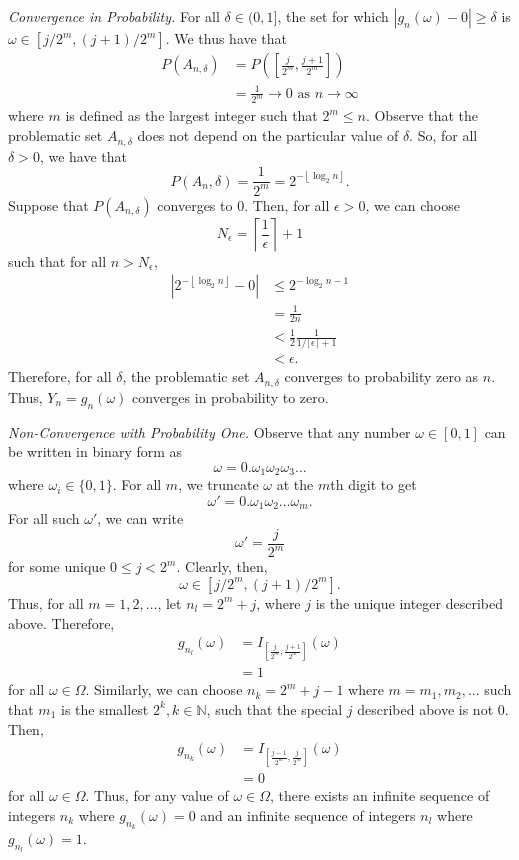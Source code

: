\documentclass[titlepage]{article}
\begin{document}
\textit{Convergence in Probability.} For all $\delta \in (0, 1]$, the set for which $|g_{n}(\omega) - 0| \geq \delta$ is $\omega \in [j/2^{m}, (j+1)/2^{m}]$. We thus have that 
\begin{align*}
    P(A_{n, \delta}) &= P\left(\left[\frac{j}{2^m}, \frac{j+1}{2^m}\right]\right) \\ 
                     &= \frac{1}{2^m} \rightarrow 0 \text{ as } n \rightarrow \infty
\end{align*}
where $m$ is defined as the largest integer such that $2^m \leq n$. Observe that the problematic set $A_{n,\delta}$ does not depend on the particular value of $\delta$. So, for all $\delta > 0$, we have that 
$$P(A_{n},\delta) = \frac{1}{2^{m}} = 2^{-\left\lfloor \log_{2}n \right\rfloor}.$$
Suppose that $P(A_{n,\delta})$ converges to $0$. Then, for all $\epsilon > 0$, we can choose 
$$N_{\epsilon} = \left\lceil \frac{1}{\epsilon} \right\rceil + 1$$
such that for all $n > N_{\epsilon}$, 
\begin{align*}
    |2^{-\left\lfloor \log_{2}n \right\rfloor} - 0| &\leq 2^{-\log_{2}n - 1} \\
                                                    &= \frac{1}{2n} \\
                                                    &< \frac{1}{2}\frac{1}{1/\lceil\epsilon\rceil+1} \\
                                                    &< \epsilon.
\end{align*}
Therefore, for all $\delta$, the problematic set $A_{n,\delta}$ converges to probability zero as $n$. Thus, $Y_{n} = g_{n}(\omega)$ converges in probability to zero.

\textit{Non-Convergence with Probability One.} Observe that any number $\omega \in [0, 1]$ can be written in binary form as 
$$\omega = 0.\omega_{1}\omega_{2}\omega_{3}\ldots$$
where $\omega_{i} \in \{0, 1\}$. For all $m$, we truncate $\omega$ at the $m$th digit to get 
$$\omega' = 0.\omega_{1}\omega_{2}\ldots\omega_{m}.$$
For all such $\omega'$, we can write 
$$\omega' = \frac{j}{2^{m}}$$
for some unique $0 \leq j < 2^{m}$. Clearly, then,  
$$\omega \in [j/2^{m}, (j+1)/2^{m}].$$
Thus, for all $m = 1, 2, \ldots$, let $n_{l} = 2^{m} + j$, where $j$ is the unique integer described above. Therefore, 
\begin{align*}
    g_{n_{l}}(\omega) &= I_{\left[\frac{j}{2^{m}}, \frac{j+1}{2^{m}}\right]}(\omega) \\
                      &= 1
\end{align*}
for all $\omega \in \Omega$. Similarly, we can choose $n_{k} = 2^{m} + j - 1$ where $m = m_{1}, m_{2}, ...$ such that $m_{1}$ is the smallest $2^{k}, k \in \mathbb{N}$, such that the special $j$ described above is not $0$. Then, 
\begin{align*}
    g_{n_{k}}(\omega) &= I_{\left[\frac{j-1}{2^{m}}, \frac{j}{2^{m}}\right]}(\omega) \\ 
                      &= 0
\end{align*}
for all $\omega \in \Omega$. Thus, for any value of $\omega \in \Omega$, there exists an infinite sequence of integers $n_{k}$ where $g_{n_{k}}(\omega) = 0$ and an infinite sequence of integers $n_{l}$ where $g_{n_{l}}(\omega) = 1$.
\end{document}
